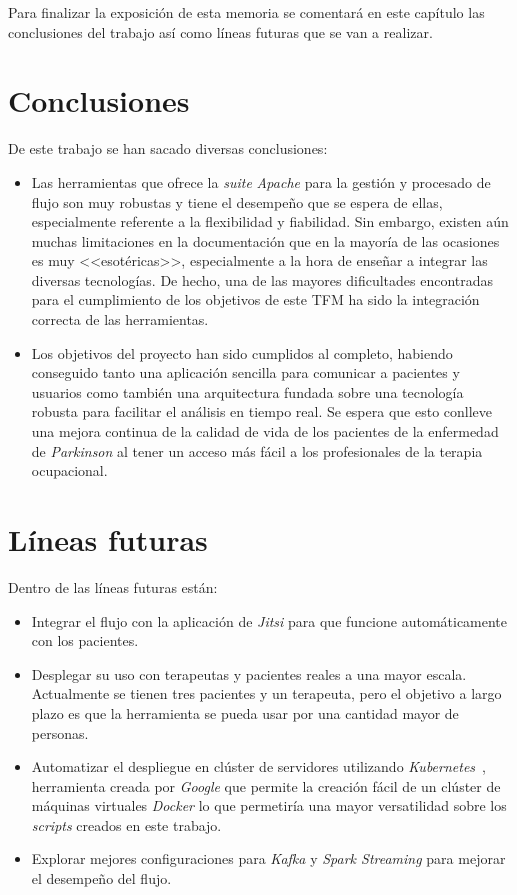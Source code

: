 
Para finalizar la exposición de esta memoria se comentará en este capítulo las conclusiones del 
trabajo así como líneas futuras que se van a realizar.

\section{Conclusiones}

De este trabajo se han sacado diversas conclusiones:

\begin{itemize}
	\item Las herramientas que ofrece la \textit{suite} \textit{Apache} para la gestión y procesado de flujo son muy robustas y tiene el desempeño que se espera de ellas, especialmente referente a la flexibilidad y fiabilidad. Sin embargo, existen aún muchas limitaciones en la documentación que en la mayoría de las ocasiones es muy <<esotéricas>>, especialmente a la hora de enseñar a integrar las diversas tecnologías. De hecho, una de las mayores dificultades encontradas para el cumplimiento de los objetivos de este TFM ha sido la integración correcta de las herramientas.
	\item Los objetivos del proyecto han sido cumplidos al completo, habiendo conseguido tanto una aplicación sencilla para comunicar a pacientes y usuarios como también una arquitectura fundada sobre una tecnología robusta para facilitar el análisis en tiempo real. Se espera que esto conlleve una mejora continua de la calidad de vida de los pacientes de la enfermedad de \textit{Parkinson} al tener un acceso más fácil a los profesionales de la terapia ocupacional.
\end{itemize}

\section{Líneas futuras}

Dentro de las líneas futuras están:

\begin{itemize}
	\item Integrar el flujo con la aplicación de \textit{Jitsi} para que funcione automáticamente con los pacientes.
	\item Desplegar su uso con terapeutas y pacientes reales a una mayor escala. Actualmente se tienen tres pacientes y un terapeuta, pero el objetivo a largo plazo es que la herramienta se pueda usar por una cantidad mayor de personas.
	\item Automatizar el despliegue en clúster de servidores utilizando \textit{Kubernetes}~\cite{losautoresdekubernetes2020}, herramienta creada por \textit{Google} que permite la creación fácil de un clúster de máquinas virtuales \textit{Docker} lo que permetiría una mayor versatilidad sobre los \textit{scripts} creados en este trabajo.
	\item Explorar mejores configuraciones para \textit{Kafka} y \textit{Spark Streaming} para mejorar el desempeño del flujo.
\end{itemize}